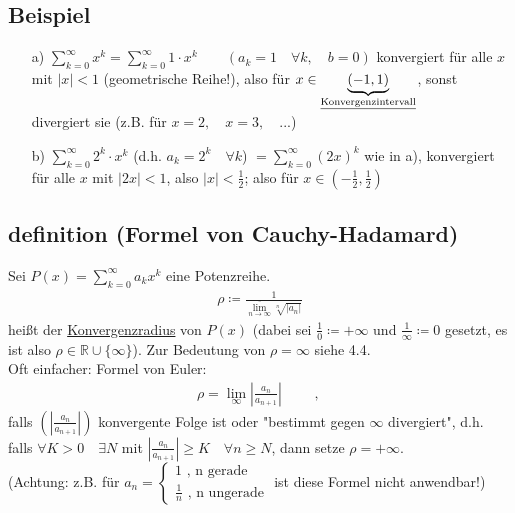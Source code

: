 \documentclass[12pt, titlepage]{article}
\newcommand{\R}{\mathds{R}}
\newcommand{\infn}{n\rightarrow\infty}
\renewcommand{\>}{\rightarrow}
\renewcommand{\*}{\cdot}
\renewcommand{\limsup}[1]{\underset{#1}{\overline{\lim}}}
\begin{document}
 \subsection{Beispiel}
 \begin{itemize}
 	\item[a)] $\sum_{k=0}^{\infty}x^k=\sum_{k=0}^{\infty}1\*x^k\qquad(a_k=1\quad\forall k,\quad b=0)$ konvergiert für alle $x$ mit $|x|<1$ (geometrische Reihe!), also für $x\in\underbrace{(-1,1)}_{\textrm{\underline{Konvergenzintervall}}}$, sonst divergiert sie (z.B. für $x=2,\quad x=3,\quad...$)
 	\item[b)] $\sum_{k=0}^{\infty}2^k\*x^k$ (d.h. $a_k=2^k\quad\forall k$) $=\sum_{k=0}^{\infty}(2x)^k$ wie in a), konvergiert für alle $x$ mit $|2x|<1$, also $|x|<\frac{1}{2}$; also für $x\in(-\frac{1}{2},\frac{1}{2})$
 \end{itemize}
 \subsection{definition (Formel von Cauchy-Hadamard)}
 Sei $P(x)=\sum_{k=0}^{\infty}a_kx^k$ eine Potenzreihe.
 \begin{align*}
 	\rho\coloneqq\frac{1}{\limsup{\infn}\sqrt[n]{|a_n|}}
 \end{align*}
 heißt der \underline{Konvergenzradius} von $P(x)$ (dabei sei $\frac{1}{0}\coloneqq+\infty$ und $\frac{1}{\infty}\coloneqq0$ gesetzt, es ist also $\rho\in\R\cup\{\infty\}$). Zur Bedeutung von $\rho=\infty$ siehe 4.4.\\
 Oft einfacher: Formel von Euler:
 \begin{align*}
 	\rho=\lim\limits_{\infty}|\frac{a_n}{a_{n+1}}|\qquad\textrm{ , }
 \end{align*}
	falls $(|\frac{a_n}{a_{n+1}}|)$ konvergente Folge ist oder "bestimmt gegen $\infty$ divergiert", d.h. falls $\forall K>0\quad\exists N$ mit $|\frac{a_n}{a_{n+1}}|\geq K\quad\forall n\geq N$, dann setze $\rho=+\infty$.\\
	(Achtung: z.B. für $a_n=\begin{cases}
	1\textrm{ , n gerade}\\
	\frac{1}{n}\textrm{ , n ungerade}
	\end{cases}$ ist diese Formel nicht anwendbar!)
\end{document}
